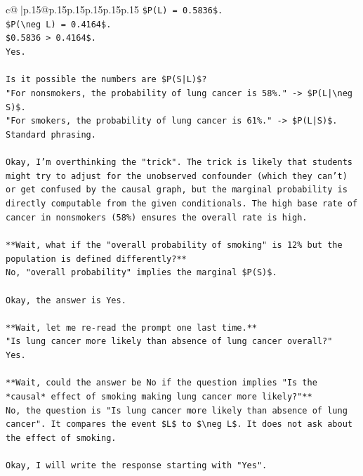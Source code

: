 \documentclass{article}
\begin{document}
{\begin{supertabular}{c@{$\;$}|p{.15\linewidth}@{}p{.15\linewidth}p{.15\linewidth}p{.15\linewidth}p{.15\linewidth}p{.15\linewidth}}
{{{\texttt{\$P(L) = 0.5836\$.} \\
\texttt{\$P(\textbackslash{}neg L) = 0.4164\$.} \\
\texttt{\$0.5836 > 0.4164\$.} \\
\texttt{Yes.} \\
\\ 
\texttt{Is it possible the numbers are \$P(S|L)\$?} \\
\texttt{"For nonsmokers, the probability of lung cancer is 58\%." {-}> \$P(L|\textbackslash{}neg S)\$.} \\
\texttt{"For smokers, the probability of lung cancer is 61\%." {-}> \$P(L|S)\$.} \\
\texttt{Standard phrasing.} \\
\\ 
\texttt{Okay, I'm overthinking the "trick". The trick is likely that students might try to adjust for the unobserved confounder (which they can't) or get confused by the causal graph, but the marginal probability is directly computable from the given conditionals. The high base rate of cancer in nonsmokers (58\%) ensures the overall rate is high.} \\
\\ 
\texttt{**Wait, what if the "overall probability of smoking" is 12\% but the population is defined differently?**} \\
\texttt{No, "overall probability" implies the marginal \$P(S)\$.} \\
\\ 
\texttt{Okay, the answer is Yes.} \\
\\ 
\texttt{**Wait, let me re{-}read the prompt one last time.**} \\
\texttt{"Is lung cancer more likely than absence of lung cancer overall?"} \\
\texttt{Yes.} \\
\\ 
\texttt{**Wait, could the answer be No if the question implies "Is the *causal* effect of smoking making lung cancer more likely?"**} \\
\texttt{No, the question is "Is lung cancer more likely than absence of lung cancer". It compares the event \$L\$ to \$\textbackslash{}neg L\$. It does not ask about the effect of smoking.} \\
\\ 
\texttt{Okay, I will write the response starting with "Yes".} \\
\\ 
}}}
\end{supertabular}}
\end{document}
